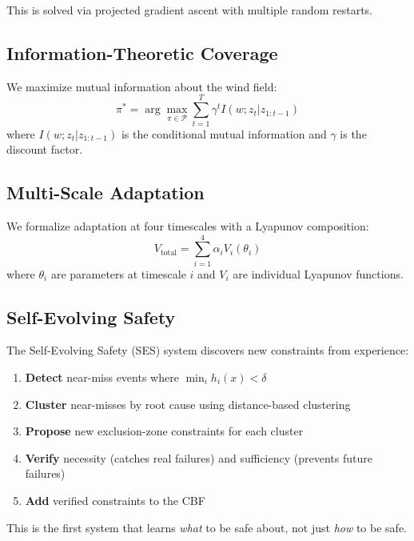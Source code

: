 This is solved via projected gradient ascent with multiple random restarts.

\subsection{Information-Theoretic Coverage}

\label{sec:information}

We maximize mutual information about the wind field:
\begin{equation}
    \pi^* = \arg\max_{\pi \in \mathcal{P}} \sum_{t=1}^T \gamma^t I(w; z_t | z_{1:t-1})
\end{equation}
where $I(w; z_t | z_{1:t-1})$ is the conditional mutual information and $\gamma$ is the discount factor.

\subsection{Multi-Scale Adaptation}

\label{sec:multiscale}

We formalize adaptation at four timescales with a Lyapunov composition:
\begin{equation}
    V_{\text{total}} = \sum_{i=1}^4 \alpha_i V_i(\theta_i)
\end{equation}
where $\theta_i$ are parameters at timescale $i$ and $V_i$ are individual Lyapunov functions.

\subsection{Self-Evolving Safety}

\label{sec:ses}

The Self-Evolving Safety (SES) system discovers new constraints from experience:
\begin{enumerate}
    \item \textbf{Detect} near-miss events where $\min_i h_i(x) < \delta$
    \item \textbf{Cluster} near-misses by root cause using distance-based clustering
    \item \textbf{Propose} new exclusion-zone constraints for each cluster
    \item \textbf{Verify} necessity (catches real failures) and sufficiency (prevents future failures)
    \item \textbf{Add} verified constraints to the CBF
\end{enumerate}

This is the first system that learns \emph{what} to be safe about, not just \emph{how} to be safe.
